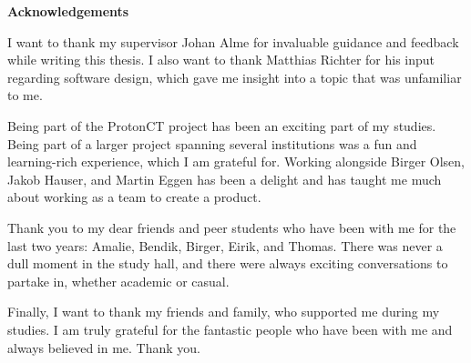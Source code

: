 \documentclass[main.tex]{subfiles}
\begin{document}
\normalsize
 \vspace*{70pt}
 \begin{center}

\textbf{Acknowledgements}\\ 

\hspace{20pt}

\end{center}
\normalsize

 I want to thank my supervisor Johan Alme for invaluable guidance and feedback while writing this thesis. I also want to thank Matthias Richter for his input regarding software design, which gave me insight into a topic that was unfamiliar to me.
 
 Being part of the ProtonCT project has been an exciting part of my studies. Being part of a larger project spanning several institutions was a fun and learning-rich experience, which I am grateful for. Working alongside Birger Olsen, Jakob Hauser, and Martin Eggen has been a delight and has taught me much about working as a team to create a product.

Thank you to my dear friends and peer students who have been with me for the last two years: Amalie, Bendik, Birger, Eirik, and Thomas. There was never a dull moment in the study hall, and there were always exciting conversations to partake in, whether academic or casual.

Finally, I want to thank my friends and family, who supported me during my studies. I am truly grateful for the fantastic people who have been with me and always believed in me. Thank you.
\end{document}
